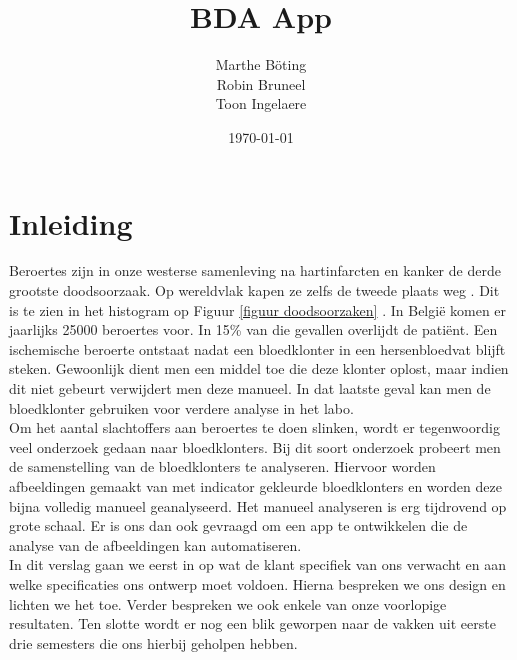 \documentclass[a4paper,kulak]{kulakarticle}
\date{\today}
\title{BDA App}
\author{Marthe B\"{o}ting\\
	Robin Bruneel\\
	Toon Ingelaere}
\begin{document}
	
	\newpage
	
	\maketitle
	\newline
	\newline
	\newline
	\newline
	\newline
	\newline
	\section*{Inleiding}
		Beroertes zijn in onze westerse samenleving na hartinfarcten en kanker de derde grootste doodsoorzaak. Op wereldvlak kapen ze zelfs de tweede plaats weg \cite{worldhealthorganization} . Dit is te zien in het histogram op Figuur \ref{figuur doodsoorzaken} . In België komen er jaarlijks 25000 beroertes voor. In 15\% van die gevallen overlijdt de patiënt. Een ischemische beroerte ontstaat nadat een bloedklonter in een hersenbloedvat blijft steken.
		Gewoonlijk dient men een middel toe die deze klonter oplost, maar indien dit niet gebeurt verwijdert men deze manueel. In dat laatste geval kan men de bloedklonter gebruiken voor verdere analyse in het labo.\\
		Om het aantal slachtoffers aan beroertes te doen slinken, wordt er tegenwoordig veel onderzoek gedaan naar bloedklonters. Bij dit soort onderzoek probeert men de samenstelling van de bloedklonters te analyseren. Hiervoor worden afbeeldingen gemaakt van met indicator gekleurde bloedklonters en worden deze bijna volledig manueel geanalyseerd. Het manueel analyseren is erg tijdrovend op grote schaal. Er is ons dan ook gevraagd om een app te ontwikkelen die de analyse van de afbeeldingen kan automatiseren.\\
		In dit verslag gaan we eerst in op wat de klant specifiek van ons verwacht en aan welke specificaties ons ontwerp moet voldoen. Hierna bespreken we ons design en lichten we het toe. Verder bespreken we ook enkele van onze voorlopige resultaten. Ten slotte wordt er nog een blik geworpen naar de vakken uit eerste drie semesters die ons hierbij geholpen hebben.
\end{document}
